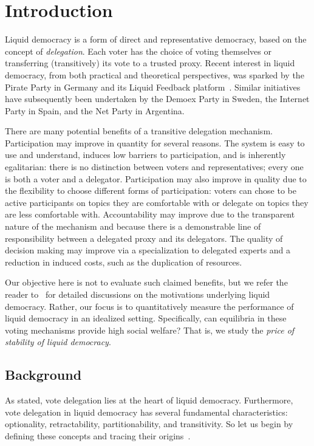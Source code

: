 \section{Introduction}
Liquid democracy is a form of direct and representative democracy, based on the concept of {\em delegation}.
Each voter has the choice of voting themselves or transferring (transitively) its vote to a trusted proxy.
Recent interest in liquid democracy, from both practical and theoretical perspectives, was sparked 
by the Pirate Party in Germany and its Liquid Feedback platform~\cite{BKN14}.
Similar initiatives have subsequently been undertaken by the 
Demoex Party in Sweden, the Internet Party in Spain, and the Net Party in Argentina.

There are many potential benefits of a transitive delegation mechanism. 
Participation may improve in quantity for several reasons. The system is easy to use and understand, induces low barriers 
to participation, and is inherently egalitarian: there is no distinction between voters and representatives; every one
is both a voter and a delegator. Participation may also improve in quality due to the flexibility to choose different 
forms of participation: voters can chose to be active participants on topics they are comfortable with or delegate on topics
they are less comfortable with. Accountability may improve due to the transparent nature of the mechanism and 
because there is a demonstrable line of responsibility between a delegated proxy and its delegators.
The quality of decision making may improve via a specialization to delegated experts
and a reduction in induced costs, such as the duplication of resources.

Our objective here is not to evaluate such claimed benefits, but we refer the reader to~\cite{Beh17, BKN14, BZ16, For02, GA15} for detailed 
discussions on the motivations underlying liquid democracy.
Rather, our focus is to quantitatively measure the performance of liquid democracy in an idealized setting.
Specifically, can equilibria in these voting mechanisms provide high social welfare?
That is, we study the {\em price of stability of liquid democracy}.

\subsection{Background}
As stated, vote delegation lies at the heart of liquid democracy. Furthermore, 
vote delegation in liquid democracy has several fundamental characteristics: optionality, retractability, 
partitionability, and transitivity. So let us begin by defining these concepts and tracing their origins~\cite{Beh17,BKN14}.

